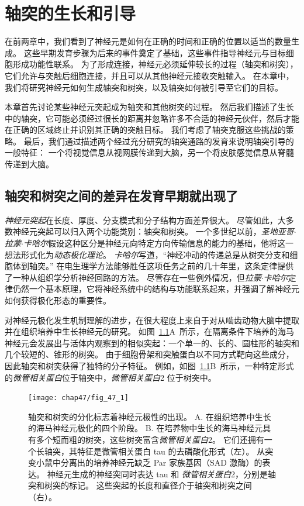 \chapter{轴突的生长和引导} \label{chap:chap47}


在前两章中，我们看到了神经元是如何在正确的时间和正确的位置以适当的数量生成。
这些早期发育步骤为后来的事件奠定了基础，这些事件指导神经元与目标细胞形成功能性联系。
为了形成连接，神经元必须延伸较长的过程（轴突和树突），它们允许与突触后细胞连接，并且可以从其他神经元接收突触输入。
在本章中，我们将研究神经元如何生成轴突和树突，以及轴突如何被引导至它们的目标。


本章首先讨论某些神经元突起成为轴突和其他树突的过程。
然后我们描述了生长中的轴突，它可能必须经过很长的距离并忽略许多不合适的神经元伙伴，然后才能在正确的区域终止并识别其正确的突触目标。
我们考虑了轴突克服这些挑战的策略。
最后，我们通过描述两个经过充分研究的轴突通路的发育来说明轴突引导的一般特征：
一个将视觉信息从视网膜传递到大脑，另一个将皮肤感觉信息从脊髓传递到大脑。



\section{轴突和树突之间的差异在发育早期就出现了}

\textit{神经元突起}在长度、厚度、分支模式和分子结构方面差异很大。
尽管如此，大多数神经元突起可以归入两个功能类别：轴突和树突。
一个多世纪以前，\textit{圣地亚哥$\cdot$拉蒙$\cdot$卡哈尔}假设这种区分是神经元向特定方向传输信息的能力的基础，他将这一想法形式化为\textit{动态极化理论}。
\textit{卡哈尔}写道，“神经冲动的传递总是从树突分支和细胞体到轴突。” 
在电生理学方法能够胜任这项任务之前的几十年里，这条定律提供了一种从组织学分析神经回路的方法。
尽管存在一些例外情况，但\textit{拉蒙$\cdot$卡哈尔}定律仍然一个基本原理，它将神经系统中的结构与功能联系起来，并强调了解神经元如何获得极化形态的重要性。


对神经元极化发生机制理解的进步，在很大程度上来自于对从啮齿动物大脑中提取并在组织培养中生长神经元的研究。
如图~\ref{fig:47_1}A~所示，在隔离条件下培养的海马神经元会发展出与活体内观察到的相似突起：一个单一的、长的、圆柱形的轴突和几个较短的、锥形的树突。
由于细胞骨架和突触蛋白以不同方式靶向这些成分，因此轴突和树突获得了独特的分子特征。
例如，如图~\ref{fig:47_1}B~所示，一种特定形式的\textit{微管相关蛋白}位于轴突中，\textit{微管相关蛋白}2 位于树突中。


\begin{figure}[htbp]
	\centering
	\texttt{[image: chap47/fig\_47\_1]}
	\caption{轴突和树突的分化标志着神经元极性的出现。
		A. 在组织培养中生长的海马神经元极化的四个阶段\cite{kaech2006culturing}。
		B. 在培养物中生长的海马神经元具有多个短而粗的树突，这些树突富含\textit{微管相关蛋白}2。
		它们还拥有一个长轴突，其特征是微管相关蛋白 tau 的去磷酸化形式（左）。
		从突变小鼠中分离出的培养神经元缺乏 Par 家族基因（SAD 激酶）的表达。
		神经元生成的神经突同时表达 tau 和 \textit{微管相关蛋白}2，分别是轴突和树突的标记。
		这些突起的长度和直径介于轴突和树突之间（右）\cite{kishi2005mammalian}。}
	\label{fig:47_1}
\end{figure}


